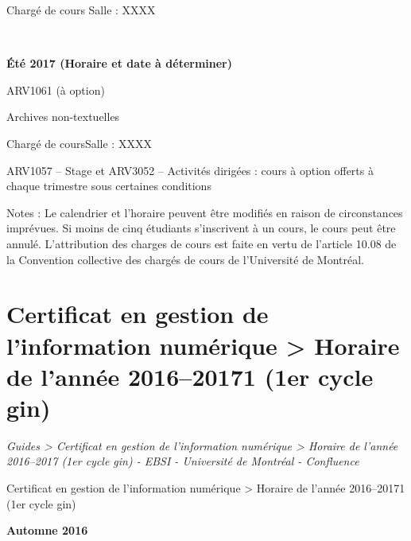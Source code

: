 \documentclass [12 pt]{article}
\begin{document}
                                Chargé de cours
                                Salle : XXXX
                            
                             
                        
                    
                
            
            
        \textbf{
        Été 2017 (Horaire et date à déterminer)
        }
    
            
                ARV1061 (à option)
            
            
                Archives non-textuelles
            
            Chargé de coursSalle : XXXX
             
            
                ARV1057 – Stage et ARV3052 – Activités dirigées : cours à option offerts à chaque
                    trimestre sous certaines conditions
            
            
                
                    
                
            
            Notes : Le calendrier et l'horaire peuvent être modifiés en raison
                de circonstances imprévues. Si moins de cinq étudiants s'inscrivent à un cours, le
                cours peut être annulé. L'attribution des charges de cours est faite en vertu de
                l'article 10.08 de la Convention collective des chargés de cours de l'Université de
                Montréal.
        
    
    
        \newpage
        \section {
        Certificat en gestion de l'information numérique > Horaire de l'année
            2016–20171 (1er cycle gin)
        }
        
        
        
        \textit{
        Guides > Certificat en gestion de l'information numérique > Horaire de
            l'année 2016–2017 (1er cycle gin) - EBSI - Université de Montréal -
            Confluence
        }
    
        Certificat en gestion de l'information numérique > Horaire de l'année
            2016–20171 (1er cycle gin)
        
            
        \textbf{
        Automne 2016
        }
    
\end{document}
